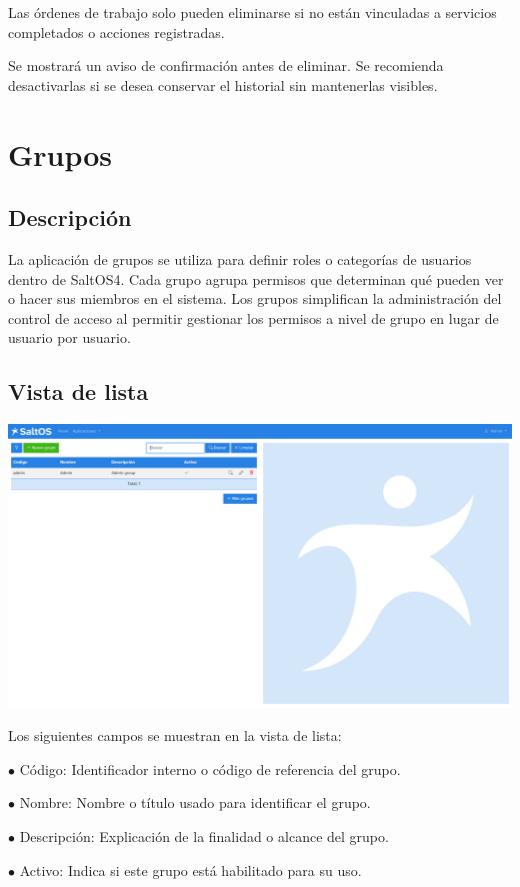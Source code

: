 \documentclass[a4paper]{article}
\begin{document}
Las órdenes de trabajo solo pueden eliminarse si no están vinculadas a servicios completados o acciones registradas.

Se mostrará un aviso de confirmación antes de eliminar.
Se recomienda desactivarlas si se desea conservar el historial sin mantenerlas visibles.


\hypertarget{toc176}{}
\section{Grupos}

\hypertarget{toc177}{}
\subsection{Descripción}

La aplicación de grupos se utiliza para definir roles o categorías de usuarios dentro de SaltOS4.
Cada grupo agrupa permisos que determinan qué pueden ver o hacer sus miembros en el sistema.
Los grupos simplifican la administración del control de acceso al permitir gestionar los permisos a nivel de grupo en lugar de usuario por usuario.

\hypertarget{toc178}{}
\subsection{Vista de lista}

\begin{center}\includegraphics[width=1\textwidth]{../ujest/snaps/test-screenshots-js-screenshots-users-groups-list-es-es-1-snap.png}\end{center}

Los siguientes campos se muestran en la vista de lista:

\begin{compactitem}
\item[\color{myblue}$\bullet$] Código: Identificador interno o código de referencia del grupo.
\item[\color{myblue}$\bullet$] Nombre: Nombre o título usado para identificar el grupo.
\item[\color{myblue}$\bullet$] Descripción: Explicación de la finalidad o alcance del grupo.
\item[\color{myblue}$\bullet$] Activo: Indica si este grupo está habilitado para su uso.
\end{compactitem}
\end{document}
